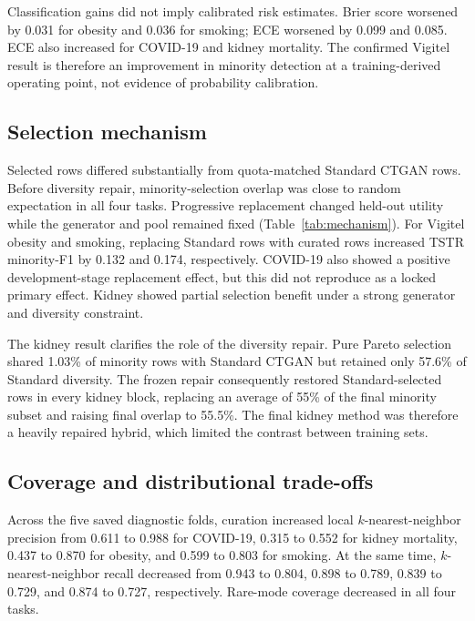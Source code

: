 Classification gains did not imply calibrated risk estimates. Brier score worsened by 0.031 for obesity and 0.036 for smoking; ECE worsened by 0.099 and 0.085. ECE also increased for COVID-19 and kidney mortality. The confirmed Vigitel result is therefore an improvement in minority detection at a training-derived operating point, not evidence of probability calibration.

\subsection{Selection mechanism}

Selected rows differed substantially from quota-matched Standard CTGAN rows. Before diversity repair, minority-selection overlap was close to random expectation in all four tasks. Progressive replacement changed held-out utility while the generator and pool remained fixed (Table~\ref{tab:mechanism}). For Vigitel obesity and smoking, replacing Standard rows with curated rows increased TSTR minority-F1 by 0.132 and 0.174, respectively. COVID-19 also showed a positive development-stage replacement effect, but this did not reproduce as a locked primary effect. Kidney showed partial selection benefit under a strong generator and diversity constraint.



The kidney result clarifies the role of the diversity repair. Pure Pareto selection shared 1.03\% of minority rows with Standard CTGAN but retained only 57.6\% of Standard diversity. The frozen repair consequently restored Standard-selected rows in every kidney block, replacing an average of 55\% of the final minority subset and raising final overlap to 55.5\%. The final kidney method was therefore a heavily repaired hybrid, which limited the contrast between training sets.

\subsection{Coverage and distributional trade-offs}

Across the five saved diagnostic folds, curation increased local $k$-nearest-neighbor precision from 0.611 to 0.988 for COVID-19, 0.315 to 0.552 for kidney mortality, 0.437 to 0.870 for obesity, and 0.599 to 0.803 for smoking. At the same time, $k$-nearest-neighbor recall decreased from 0.943 to 0.804, 0.898 to 0.789, 0.839 to 0.729, and 0.874 to 0.727, respectively. Rare-mode coverage decreased in all four tasks.

